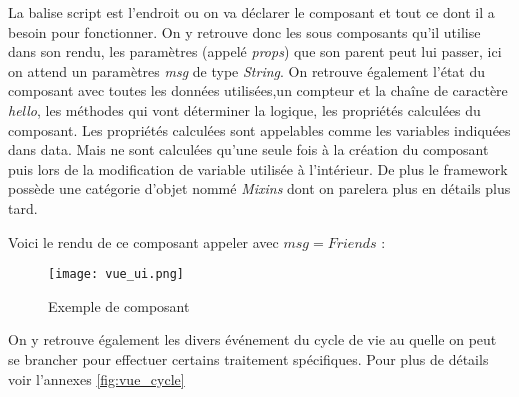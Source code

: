 La balise script est l'endroit ou on va déclarer le composant et tout ce dont il a besoin pour fonctionner. On y retrouve donc les sous composants qu'il utilise dans son rendu, les paramètres (appelé \textit{props}) que son parent peut lui passer, ici on attend un paramètres \textit{msg} de type \textit{String}. On retrouve également l'état du composant avec toutes les données utilisées,un compteur et la chaîne de caractère \textit{hello}, les méthodes qui vont déterminer la logique, les propriétés calculées du composant. Les propriétés calculées sont appelables comme les variables indiquées dans data. Mais ne sont calculées qu'une seule fois à la création du composant puis lors de la modification de variable utilisée à l'intérieur. 
De plus le framework possède une catégorie d'objet nommé \textit{Mixins} dont on parelera plus en détails plus tard.

Voici le rendu de ce composant appeler avec $msg = Friends$ :
\begin{figure}[htbp]
    \center
    \texttt{[image: vue\_ui.png]}
    \caption{Exemple de composant}
    
\end{figure}

On y retrouve également les divers événement du cycle de vie au quelle on  peut se brancher pour effectuer certains traitement spécifiques. Pour plus de détails voir l'annexes \ref{fig:vue_cycle}


